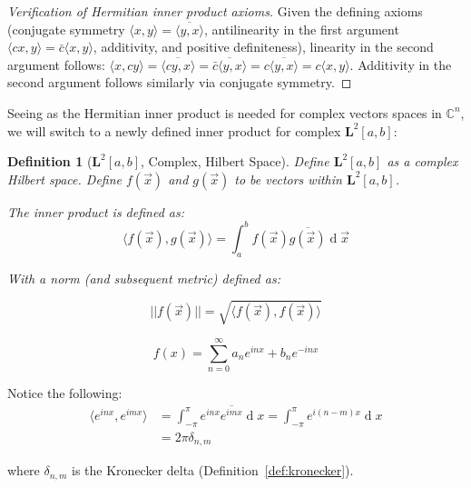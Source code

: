 \documentclass[12pt,a4paper]{report}
\DeclareMathOperator{\deriv}{d}
\theoremstyle{thms}
\theoremstyle{defns}
\newtheorem{definition}{Definition}[section]
\begin{document}
\begin{proof}[Verification of Hermitian inner product axioms]
    Given the defining axioms (conjugate symmetry $\langle x, y \rangle = \overline{\langle y, x \rangle}$, antilinearity in the first argument $\langle cx, y \rangle = \bar{c}\langle x, y \rangle$, additivity, and positive definiteness), linearity in the second argument follows: $\langle x, cy \rangle = \overline{\langle cy, x \rangle} = \overline{\bar{c}\langle y, x \rangle} = c\overline{\langle y, x \rangle} = c\langle x, y \rangle$. Additivity in the second argument follows similarly via conjugate symmetry.
\end{proof}

Seeing as the Hermitian inner product is needed for complex vectors spaces in $\mathbb{C}^n$, we will switch to a newly defined inner product for complex $\mathbf{L}^2[a, b]$:

\begin{definition}[$\mathbf{L}^2{[a, b]}$, Complex, Hilbert Space]
    Define $\mathbf{L}^2[a, b]$ as a complex Hilbert space. Define $f(\vec{x})$ and  $g(\vec{x})$ to be vectors within $\mathbf{L}^2[a, b]$.

    The inner product is defined as:
    \begin{equation}
        \langle f(\vec{x}), g(\vec{x}) \rangle = \int_{a}^{b}f(\vec{x})\overline{g(\vec{x})} \deriv{\vec{x}}
    \end{equation}

    With a norm (and subsequent metric) defined as:

    \begin{equation}
        ||f(\vec{x})|| = \sqrt{\langle f(\vec{x}), f(\vec{x}) \rangle}
    \end{equation}

\end{definition}


\begin{equation}
    f(x) = \sum_{n=0}^{\infty} a_ne^{inx} + b_ne^{-inx}
    \label{eq:bad_fourier}
\end{equation}

Notice the following:
\begin{align}
    \langle e^{inx}, e^{imx} \rangle & = \int_{-\pi}^{\pi}e^{inx}\overline{e^{imx}}\deriv{x} = \int_{-\pi}^{\pi}e^{i(n-m)x}\deriv{x} \\
                                     & = 2\pi\delta_{n, m}
\end{align}

where $\delta_{n, m}$ is the Kronecker delta (Definition~\ref{def:kronecker}).
\end{document}
